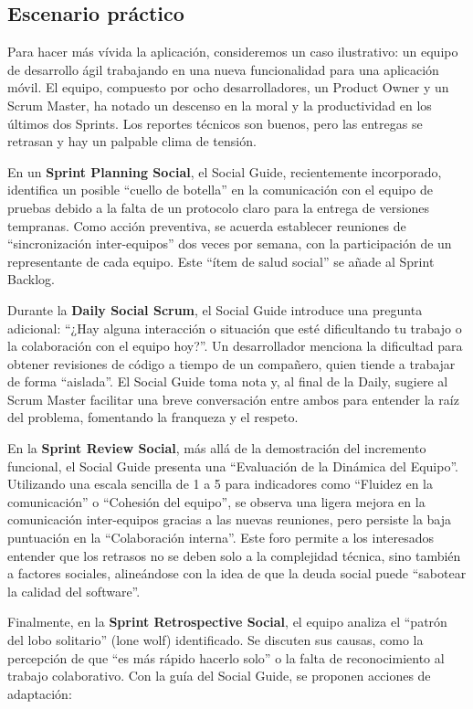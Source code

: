 \subsection{Escenario práctico}
Para hacer más vívida la aplicación, consideremos un caso ilustrativo: un equipo de desarrollo ágil trabajando en una nueva funcionalidad para una aplicación móvil. El equipo, compuesto por ocho desarrolladores, un Product Owner y un Scrum Master, ha notado un descenso en la moral y la productividad en los últimos dos Sprints. Los reportes técnicos son buenos, pero las entregas se retrasan y hay un palpable clima de tensión.

En un \textbf{Sprint Planning Social}, el Social Guide, recientemente incorporado, identifica un posible ``cuello de botella'' en la comunicación con el equipo de pruebas debido a la falta de un protocolo claro para la entrega de versiones tempranas. Como acción preventiva, se acuerda establecer reuniones de ``sincronización inter-equipos'' dos veces por semana, con la participación de un representante de cada equipo. Este ``ítem de salud social'' se añade al Sprint Backlog.

Durante la \textbf{Daily Social Scrum}, el Social Guide introduce una pregunta adicional: ``¿Hay alguna interacción o situación que esté dificultando tu trabajo o la colaboración con el equipo hoy?''. Un desarrollador menciona la dificultad para obtener revisiones de código a tiempo de un compañero, quien tiende a trabajar de forma ``aislada''. El Social Guide toma nota y, al final de la Daily, sugiere al Scrum Master facilitar una breve conversación entre ambos para entender la raíz del problema, fomentando la franqueza y el respeto.

En la \textbf{Sprint Review Social}, más allá de la demostración del incremento funcional, el Social Guide presenta una ``Evaluación de la Dinámica del Equipo''. Utilizando una escala sencilla de 1 a 5 para indicadores como ``Fluidez en la comunicación'' o ``Cohesión del equipo'', se observa una ligera mejora en la comunicación inter-equipos gracias a las nuevas reuniones, pero persiste la baja puntuación en la ``Colaboración interna''. Este foro permite a los interesados entender que los retrasos no se deben solo a la complejidad técnica, sino también a factores sociales, alineándose con la idea de que la deuda social puede ``sabotear la calidad del software''.

Finalmente, en la \textbf{Sprint Retrospective Social}, el equipo analiza el ``patrón del lobo solitario'' (lone wolf) identificado. Se discuten sus causas, como la percepción de que ``es más rápido hacerlo solo'' o la falta de reconocimiento al trabajo colaborativo. Con la guía del Social Guide, se proponen acciones de adaptación:

